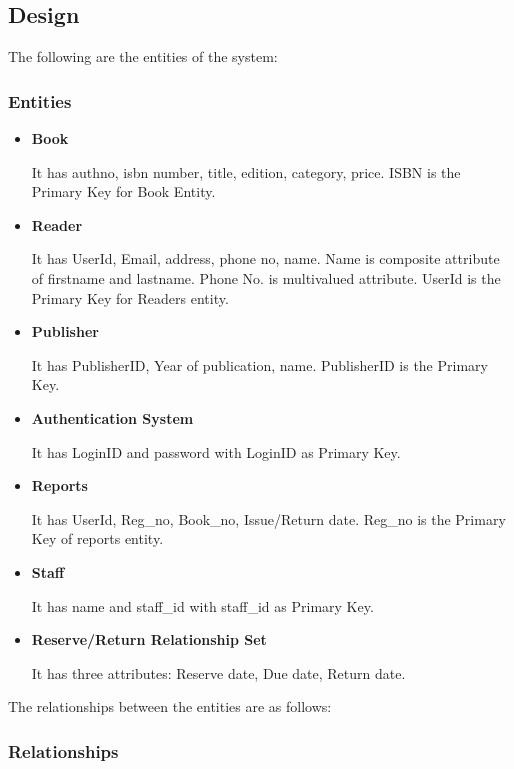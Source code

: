\subsection{Design}

The following are the entities of the system:

\subsubsection{Entities}

\begin{itemize}
    \item \textbf{Book}

          It has authno, isbn number, title, edition, category,
          price. ISBN is the Primary Key for Book Entity.
    \item \textbf{Reader}

          It has UserId, Email, address, phone no, name.
          Name is composite attribute of firstname and lastname. Phone No. is multivalued attribute. UserId is the Primary Key for Readers
          entity.
    \item \textbf{Publisher}

          It has PublisherID, Year of publication,
          name. PublisherID is the Primary Key.
    \item \textbf{Authentication System}

          It has LoginID and password
          with LoginID as Primary Key.
    \item \textbf{Reports}

          It has UserId, Reg\_no, Book\_no, Issue/Return
          date. Reg\_no is the Primary Key of reports entity.
    \item \textbf{Staff}

          It has name and staff\_id with staff\_id as Primary Key.
    \item \textbf{Reserve/Return Relationship Set}

          It has three attributes:
          Reserve date, Due date, Return date.
\end{itemize}

The relationships between the entities are as follows:

\subsubsection{Relationships}


